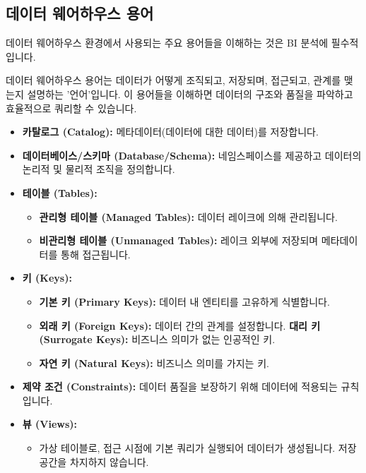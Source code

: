 \documentclass[11pt,a4paper]{article}
\theoremstyle{definition}
\begin{document}
\subsection{데이터 웨어하우스 용어}
데이터 웨어하우스 환경에서 사용되는 주요 용어들을 이해하는 것은 BI 분석에 필수적입니다.

\begin{summarybox}[title=핵심 요약: 데이터 구조의 언어]
데이터 웨어하우스 용어는 데이터가 어떻게 조직되고, 저장되며, 접근되고, 관계를 맺는지 설명하는 '언어'입니다. 이 용어들을 이해하면 데이터의 구조와 품질을 파악하고 효율적으로 쿼리할 수 있습니다.
\end{summarybox}

\begin{itemize}
    \item \textbf{카탈로그 (Catalog):} 메타데이터(데이터에 대한 데이터)를 저장합니다.
    \item \textbf{데이터베이스/스키마 (Database/Schema):} 네임스페이스를 제공하고 데이터의 논리적 및 물리적 조직을 정의합니다.
    \item \textbf{테이블 (Tables):}
    \begin{itemize}
        \item \textbf{관리형 테이블 (Managed Tables):} 데이터 레이크에 의해 관리됩니다.
        \item \textbf{비관리형 테이블 (Unmanaged Tables):} 레이크 외부에 저장되며 메타데이터를 통해 접근됩니다.
    \end{itemize}
    \item \textbf{키 (Keys):}
    \begin{itemize}
        \item \textbf{기본 키 (Primary Keys):} 데이터 내 엔티티를 고유하게 식별합니다.
        \item \textbf{외래 키 (Foreign Keys):} 데이터 간의 관계를 설정합니다.
        \textbf{대리 키 (Surrogate Keys):} 비즈니스 의미가 없는 인공적인 키.
        \item \textbf{자연 키 (Natural Keys):} 비즈니스 의미를 가지는 키.
    \end{itemize}
    \item \textbf{제약 조건 (Constraints):} 데이터 품질을 보장하기 위해 데이터에 적용되는 규칙입니다.
    \item \textbf{뷰 (Views):}
    \begin{itemize}
        \item 가상 테이블로, 접근 시점에 기본 쿼리가 실행되어 데이터가 생성됩니다. 저장 공간을 차지하지 않습니다.
    \end{itemize}

\end{itemize}
\end{document}
